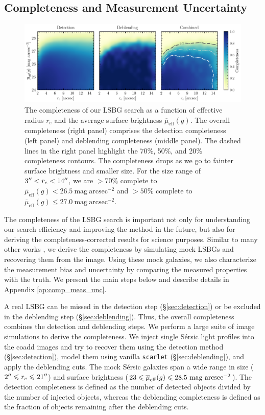 \documentclass[twocolumn,astrosymb,twocolappendix]{aastex631}
\newcommand{\sbunit}{\mathrm{mag\ arcsec}^{-2}}
\newcommand{\sbeff}{\overline{\mu}_{\mathrm{eff}}(g)}
\newcommand{\code}[1]{\texttt{#1}}
\newcommand{\sersic}{S\'ersic}
\begin{document}
\begin{CJK*}{UTF8}{gbsn}
\subsection{Completeness and Measurement Uncertainty}\label{sec:comp_meas}
\begin{figure}
	\vbox{ 
		\centering
		\includegraphics[width=1\linewidth]{completeness.pdf}
	}
	\caption{The completeness of our LSBG search as a function of effective radius $r_e$ and the average surface brightness $\sbeff$. The overall completeness (right panel) comprises the detection completeness (left panel) and deblending completeness (middle panel). The dashed lines in the right panel highlight the 70\%, 50\%, and 20\% completeness contours. The completeness drops as we go to fainter surface brightness and smaller size. For the size range of $3\mbox{$^{\prime\prime}$} < r_e < 14\mbox{$^{\prime\prime}$}$, we are $>70\%$ complete to $\sbeff < 26.5\ \sbunit$ and $>50\%$ complete to $\sbeff \leqslant 27.0\ \sbunit$. 
	}
	\label{fig:completeness}
\end{figure}

The completeness of the LSBG search is important not only for understanding our search efficiency and improving the method in the future, but also for deriving the completeness-corrected results for science purposes. Similar to many other works \citep[e.g.,][]{vdBurg2017,Zaritsky2021,CarlstenELVES2022,Greene2022}, we derive the completeness by simulating mock LSBGs and recovering them from the image. Using these mock galaxies, we also characterize the measurement bias and uncertainty by comparing the measured properties with the truth. We present the main steps below and describe details in Appendix \ref{ap:comp_meas_unc}.

A real LSBG can be missed in the detection step (\S \ref{sec:detection}) or be excluded in the deblending step (\S \ref{sec:deblending}). Thus, the overall completeness combines the detection and deblending steps. We perform a large suite of image simulations to derive the completeness. We inject single \sersic{} light profiles \citep{Sersic1963} into the coadd images and try to recover them using the detection method (\S\ref{sec:detection}), model them using vanilla \code{scarlet} (\S\ref{sec:deblending}), and apply the deblending cuts. The mock \sersic{} galaxies span a wide range in size ($2\mbox{$^{\prime\prime}$} \leqslant r_{e} \leqslant 21\mbox{$^{\prime\prime}$}$) and surface brightness ($23 \leqslant \overline{\mu}_{\rm eff}(g) \leqslant 28.5\ \mathrm{mag\ arcsec^{-2}}$). The detection completeness is defined as the number of detected objects divided by the number of injected objects, whereas the deblending completeness is defined as the fraction of objects remaining after the deblending cuts. 


\end{CJK*}
\end{document}
